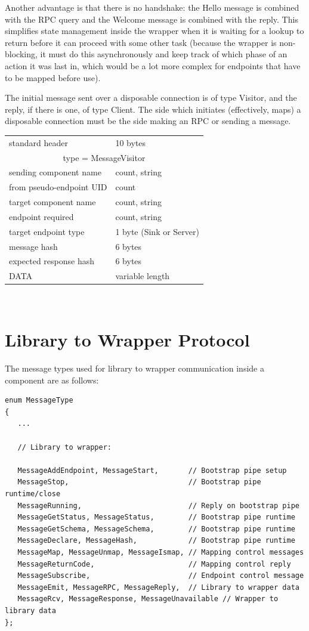 \documentclass[12pt,a4paper,twoside]{article}
\renewcommand{\_}{\texttt{\symbol{95}}}
\begin{document}
Another advantage is that there is no handshake: the Hello message is combined
with the RPC query and the Welcome message is combined with the reply. This
simplifies state management inside the wrapper when it is waiting for a lookup
to return before it can proceed with some other task (because the wrapper is
non-blocking, it must do this asynchronously and keep track of which phase of
an action it was last in, which would be a lot more complex for endpoints that
have to be mapped before use).

The initial message sent over a disposable connection is of type
Visitor, and the reply, if there is one, of type Client.
The side which initiates (effectively, maps) a disposable connection
must be the side making an RPC or sending a message.

\begin{tabular}{|ll|}
\hline
standard header    & 10 bytes\\
\multicolumn{2}{|c|}{type = MessageVisitor}\\
\hline
sending component name  & count, string\\
from pseudo-endpoint UID          & count\\
target component name   & count, string\\
endpoint required  & count, string\\
target endpoint type    & 1 byte (Sink or Server)\\
message hash       & 6 bytes\\
expected response hash      & 6 bytes\\
DATA               & variable length\\
\hline
\end{tabular}\\

\section{Library to Wrapper Protocol}
\label{lib-wrapper}

The message types used for library to wrapper communication inside
a component are as follows:

\begin{verbatim}
enum MessageType
{
   ...
	
   // Library to wrapper:
   
   MessageAddEndpoint, MessageStart,       // Bootstrap pipe setup
   MessageStop,                            // Bootstrap pipe runtime/close
   MessageRunning,                         // Reply on bootstrap pipe
   MessageGetStatus, MessageStatus,        // Bootstrap pipe runtime
   MessageGetSchema, MessageSchema,        // Bootstrap pipe runtime
   MessageDeclare, MessageHash,            // Bootstrap pipe runtime
   MessageMap, MessageUnmap, MessageIsmap, // Mapping control messages
   MessageReturnCode,                      // Mapping control reply
   MessageSubscribe,                       // Endpoint control message
   MessageEmit, MessageRPC, MessageReply,  // Library to wrapper data
   MessageRcv, MessageResponse, MessageUnavailable // Wrapper to library data
};
\end{verbatim}
\end{document}
